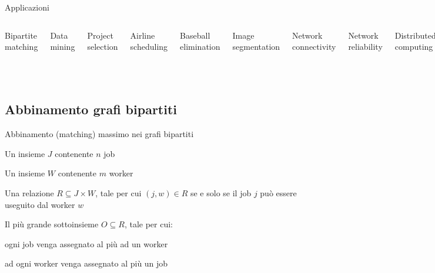 \begin{frame}{Applicazioni}

\begin{columns}[T]
\BIL
\item Bipartite matching
\item Data mining
\item Project selection
\item Airline scheduling
\item Baseball elimination
\item Image segmentation
\item Network connectivity
\EIL
{}
\BIL
\item Network reliability
\item Distributed computing
\item Egalitarian stable matching
\item Security of statistical data
\item Network intrusion detection
\item Multi-camera scene reconstruction
\item Gene function prediction
\EIL
\end{columns}

\end{frame}

\subsection{Abbinamento grafi bipartiti}

\begin{frame}{Abbinamento (matching) massimo nei grafi bipartiti}

\vspace{-9pt}
\begin{myboxtitle}
\BIL
\item Un insieme $J$ contenente $n$ job
\item Un insieme $W$ contenente $m$ worker
\item Una relazione $R \subseteq J \times W$, tale per cui $(j,w) \in R$
se e solo se il job $j$ può essere useguito dal worker $w$
\EIL
\end{myboxtitle}

\begin{myboxtitle}
\BIL
\item Il più grande sottoinsieme $O \subseteq R$, tale per cui:
  \BI
  \item ogni job venga assegnato al più ad un worker
  \item ad ogni worker venga assegnato al più un job
  \EI
\EIL
\end{myboxtitle}

\end{frame}
  
